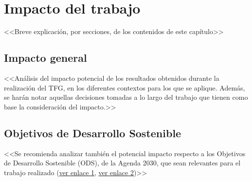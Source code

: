 \chapter{Impacto del trabajo} \label{chp:impacto}

<<Breve explicación, por secciones, de los contenidos de este capítulo>>


\section{Impacto general} \label{sct:impacto:general}

<<Análisis del impacto potencial de los resultados obtenidos durante la realización del TFG, en los diferentes contextos para los que se aplique.
Además, se harán notar aquellas decisiones tomadas a lo largo del trabajo que tienen como base la consideración del impacto.>>


\section{Objetivos de Desarrollo Sostenible} \label{sct:impacto:ods}

<<Se recomienda analizar también el potencial impacto respecto a los Objetivos de Desarrollo Sostenible (ODS), de la Agenda 2030, que sean relevantes para el trabajo realizado (\href{https://www.un.org/sustainabledevelopment/es/objetivos-de-desarrollo-sostenible/}{ver enlace 1}, \href{https://www.agenda2030.gob.es/objetivos/home.htm}{ver enlace 2})>>

